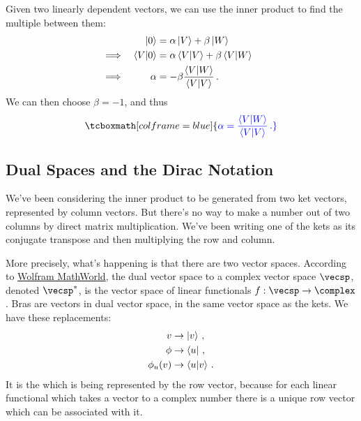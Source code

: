 \begin{remark}
Given two linearly dependent vectors, we can use the inner product to find the multiple between them:
\begin{alignat}{3}
    &&\ket{0} &= \alpha\ket{V} + \beta\ket{W}& \\
    &\implies &\braket{V}{0} &= \alpha\braket{V} + \beta\braket{V}{W} \\
    &\implies &\alpha &= -\beta\frac{\braket{V}{W}}{\braket{V}}\,.
\end{alignat}
We can then choose $\beta = -1$, and thus
\begin{equation}\label{two vector multiple}
    \tcboxmath[colframe=blue]{\color{blue}\alpha = \frac{\braket{V}{W}}{\braket{V}}\,.}
\end{equation}
\end{remark}


\subsection{Dual Spaces and the Dirac Notation}

We've been considering the inner product to be generated from two ket vectors, represented by column vectors. But there's no way to make a number out of two columns by direct matrix multiplication. We've been writing one of the kets as its conjugate transpose and then multiplying the row and column.

More precisely, what's happening is that there are two vector spaces. According to \href{http://mathworld.wolfram.com/DualVectorSpace.html}{Wolfram MathWorld}, the dual vector space to a complex vector space $\vecsp$, denoted $\vecsp^*$, is the vector space of linear functionals $f : \vecsp \rightarrow \complex$. Bras are vectors in  dual vector space,  in the same vector space as the kets. We have these replacements:
\begin{align}
    v &\rightarrow \ket{v}\,, \\
    \phi &\rightarrow \bra{u}\,, \\
    \phi_u(v) &\rightarrow \braket{u}{v}\,.
\end{align}
It is the  which is being represented by the row vector, because for each linear functional which takes a vector to a complex number there is a unique row vector which can be associated with it.


